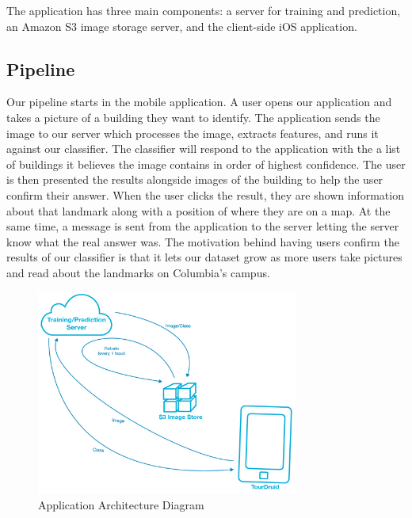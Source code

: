 The application has three main components: a server for training and prediction, an Amazon S3 image storage server, and the client-side iOS application. 

\subsection{Pipeline}
Our pipeline starts in the mobile application. A user opens our application and takes a picture of a building they want to identify. The application sends the image to our server which processes the image, extracts features, and runs it against our classifier. The classifier will respond to the application with the a list of buildings it believes the image contains in order of highest confidence. The user is then presented the results alongside images of the building to help the user confirm their answer. When the user clicks the result, they are shown information about that landmark along with a position of where they are on a map. At the same time, a message is sent from the application to the server letting the server know what the real answer was. The motivation behind having users confirm the results of our classifier is that it lets our dataset grow as more users take pictures and read about the landmarks on Columbia's campus.

\begin{figure}
\includegraphics[width=86mm]{app_arch.png}

\caption{Application Architecture Diagram}
\label{overflow}

\end{figure}

